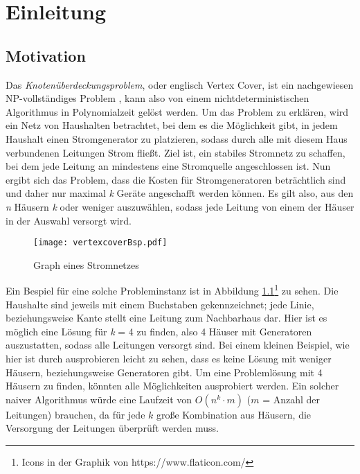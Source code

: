 
\chapter{Einleitung}
\label{ch:Einleitung}

\section{Motivation}
\label{ch:Einleitung:sec:Motivation}
Das \emph{Knotenüberdeckungsproblem}, oder englisch Vertex Cover, ist ein nachgewiesen NP-vollständiges Problem \cite{intract}, kann also von einem nichtdeterministischen Algorithmus in Polynomialzeit gelöst werden. Um das Problem zu erklären, wird ein Netz von Haushalten betrachtet, bei dem es die Möglichkeit gibt, in jedem Haushalt einen Stromgenerator zu platzieren, sodass durch alle mit diesem Haus verbundenen Leitungen Strom fließt. Ziel ist, ein stabiles Stromnetz zu schaffen, bei dem jede Leitung an mindestens eine Stromquelle angeschlossen ist. Nun ergibt sich das Problem, dass die Kosten für Stromgeneratoren beträchtlich sind und daher nur maximal \emph{k} Geräte angeschafft werden können. Es gilt also, aus den \emph{n} Häusern \emph{k} oder weniger auszuwählen, sodass jede Leitung von einem der Häuser in der Auswahl versorgt wird.
\begin{figure}[htb]
\centering
  	{\texttt{[image: vertexcoverBsp.pdf]}}
	\caption{Graph eines Stromnetzes \label{fig:vc}}
\centering
\end{figure}
Ein Bespiel für eine solche Probleminstanz ist in Abbildung \ref{fig:vc}\footnote{Icons in der Graphik von https://www.flaticon.com/} zu sehen. Die Haushalte sind jeweils mit einem Buchstaben gekennzeichnet; jede Linie, beziehungsweise Kante stellt eine Leitung zum Nachbarhaus dar. Hier ist es möglich eine Lösung für \emph{k} = 4 zu finden, also 4 Häuser mit Generatoren auszustatten, sodass alle Leitungen versorgt sind. Bei einem kleinen Beispiel, wie hier ist durch ausprobieren leicht zu sehen, dass es keine Lösung mit weniger Häusern, beziehungsweise Generatoren gibt. Um eine Problemlösung mit 4 Häusern zu finden, könnten alle Möglichkeiten ausprobiert werden. Ein solcher naiver Algorithmus würde eine Laufzeit von $O(n^{k} \cdot m)$ ($m$ = Anzahl der Leitungen) brauchen, da für jede $k$ große Kombination aus Häusern, die Versorgung der Leitungen überprüft werden muss.\\
